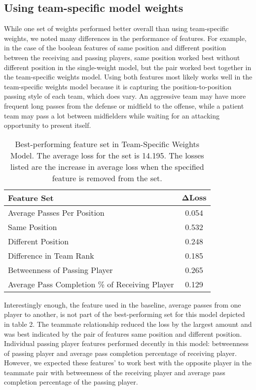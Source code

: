 \documentclass[11pt,letterpaper]{article}
\begin{document}
\subsection{Using team-specific model weights}

While one set of weights performed better overall than using team-specific weights, we noted many differences in the performance of features.  For example, in the case of the boolean features of same position and different position between the receiving and passing players, same position worked best without different position in the single-weight model, but the pair worked best together in the team-specific weights model.  Using both features most likely works well in the team-specific weights model because it is capturing the position-to-position passing style of each team, which does vary.  An aggressive team may have more frequent long passes from the defense or midfield to the offense, while a patient team may pass a lot between midfielders while waiting for an attacking opportunity to present itself.

\begin {table}
\begin{center}

\begin{tabularx}{\columnwidth}{|X|c|}
\hline \bf{Feature Set} & $\mathbf{\Delta Loss}$ \\ \hline
Average Passes Per Position & 0.054 \\ \hline
Same Position & 0.532 \\ \hline
Different Position & 0.248 \\ \hline
Difference in Team Rank & 0.185 \\ \hline
Betweenness of Passing Player & 0.265 \\ \hline
Average Pass Completion \% of Receiving Player & 0.129 \\ \hline
\end{tabularx} 

\caption {Best-performing feature set in Team-Specific Weights Model. The average loss for the set is 14.195. The losses listed are the increase in average loss when the specified feature is removed from the set.}
\end{center}
\end {table}

Interestingly enough, the feature used in the baseline, average passes from one player to another, is not part of the best-performing set for this model depicted in table 2.  The teammate relationship reduced the loss by the largest amount and was best indicated by the pair of features same position and different position.  Individual passing player features performed decently in this model: betweenness of passing player and average pass completion percentage of receiving player.  However, we expected these features' to work best with the opposite player in the teammate pair with betweenness of the receiving player and average pass completion percentage of the passing player. 
\end{document}

